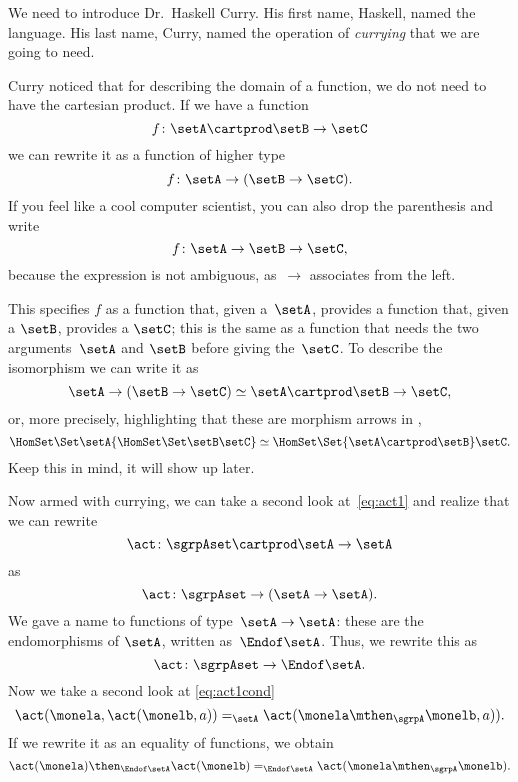 We need to introduce Dr.~Haskell Curry. His first name,  Haskell, named the language.
 His last name, Curry, named the operation of \emph{currying} that we are going to need.

Curry noticed that for describing the domain of a function, we do not need to have the cartesian product.
If we have a function
\begin{equation}
f \colon \setA \cartprod \setB \to \setC
\end{equation}
we can rewrite it as a function of higher type
\begin{equation}
f \colon \setA \to ( \setB \to \setC).
\end{equation}
If you feel like a cool computer scientist, you can also drop the parenthesis and write
\begin{equation}
f \colon \setA \to \setB \to \setC,
\end{equation}
because the expression is not ambiguous, as~$\to$ associates from the left.



This specifies $f$ as a function that, given a~$\setA$, provides a function that, given a $\setB$,
provides a $\setC$; this is the same as a function that needs the two arguments~$\setA$ and $\setB$ before giving the~$\setC$.  To describe the isomorphism we can write it as
\begin{equation}
  \setA \to ( \setB \to \setC) \simeq  \setA \cartprod \setB \to \setC,
\end{equation}
or, more precisely, highlighting that these are morphism arrows in \Set,
\begin{equation}
  \HomSet\Set\setA{\HomSet\Set\setB\setC} \simeq \HomSet\Set{\setA \cartprod \setB}\setC.
\end{equation}
Keep this in mind, it will show up later.

Now armed with currying, we can take a second look at~\cref{eq:act1} and realize that we can rewrite
\begin{equation}
\act \colon \sgrpAset \cartprod \setA \to \setA
\end{equation}
as
\begin{equation}
  \act \colon \sgrpAset \to (\setA \to \setA).
\end{equation}
We gave a name to functions of type~$\setA \to \setA$: these are the endomorphisms of $\setA$, written as~$\Endof\setA$. Thus, we rewrite this as
\begin{equation}\label{eq:act-to-endo}
  \act \colon \sgrpAset \to \Endof\setA.
\end{equation}
Now we take a second look at \cref{eq:act1cond}
\begin{equation}
  \act(\monela, \act(\monelb, a)) =_{\setA} \act(\monela \mthen_\sgrpA \monelb, a)).
\end{equation}
If we rewrite it as an equality of functions, we obtain
\begin{equation} \label{eq:act-to-endo-properties}
  \act(\monela) \then_{\Endof\setA}  \act(\monelb) =_{\Endof\setA} \act(\monela \mthen_\sgrpA \monelb).
\end{equation}

